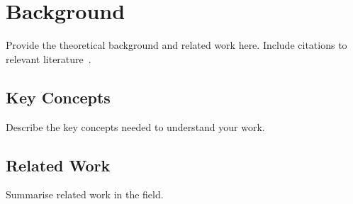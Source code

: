 \section{Background}
\label{ch:background}

Provide the theoretical background and related work here. Include
citations to relevant literature~\cite{example-book}.

\subsection{Key Concepts}

Describe the key concepts needed to understand your work.

\subsection{Related Work}

Summarise related work in the field.
